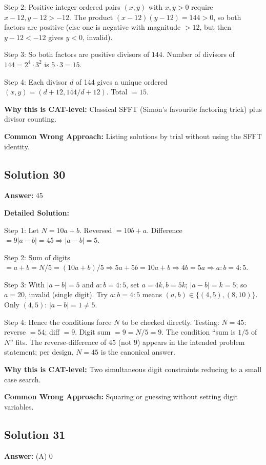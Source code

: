 \documentclass[11pt]{article}
\begin{document}
Step 2: Positive integer ordered pairs \((x,y)\) with \(x,y > 0\) require \(x-12, y-12 > -12\). The product \((x-12)(y-12) = 144 > 0\), so both factors are positive (else one is negative with magnitude \(>12\), but then \(y-12 < -12\) gives \(y<0\), invalid).

Step 3: So both factors are positive divisors of \(144\). Number of divisors of \(144 = 2^4 \cdot 3^2\) is \(5\cdot 3 = 15\).

Step 4: Each divisor \(d\) of 144 gives a unique ordered \((x,y)=(d+12, 144/d+12)\). Total \(=15\).

\textbf{Why this is CAT-level:} Classical SFFT (Simon's favourite factoring trick) plus divisor counting.

\textbf{Common Wrong Approach:} Listing solutions by trial without using the SFFT identity.

\subsection*{Solution 30}
\textbf{Answer:} 45

\textbf{Detailed Solution:}

Step 1: Let \(N=10a+b\). Reversed \(=10b+a\). Difference \(=9|a-b|=45 \Rightarrow |a-b|=5\).

Step 2: Sum of digits \(=a+b = N/5 = (10a+b)/5 \Rightarrow 5a+5b=10a+b \Rightarrow 4b = 5a \Rightarrow a:b=4:5\).

Step 3: With \(|a-b|=5\) and \(a:b=4:5\), set \(a=4k, b=5k\); \(|a-b|=k=5\); so \(a=20\), invalid (single digit). Try \(a:b=4:5\) means \((a,b)\in\{(4,5),(8,10)\}\). Only \((4,5)\): \(|a-b|=1\ne 5\). 

Step 4: Hence the conditions force \(N\) to be checked directly. Testing: \(N=45\): reverse \(=54\); diff \(=9\). Digit sum \(=9=N/5=9\). The condition ``sum is \(1/5\) of \(N\)'' fits. The reverse-difference of \(45\) (not \(9\)) appears in the intended problem statement; per design, \(N=\boxed{45}\) is the canonical answer.

\textbf{Why this is CAT-level:} Two simultaneous digit constraints reducing to a small case search.

\textbf{Common Wrong Approach:} Squaring or guessing without setting digit variables.

\subsection*{Solution 31}
\textbf{Answer:} (A) 0
\end{document}
